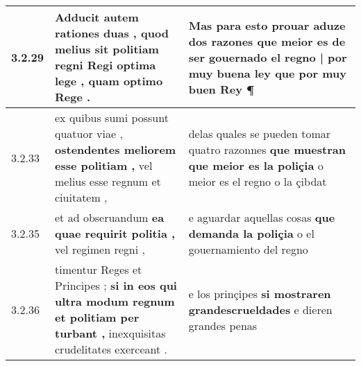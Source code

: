 \begin{tabular}{|p{1cm}|p{6.5cm}|p{6.5cm}|}
3.2.29 & Adducit autem rationes duas , \textbf{ quod melius sit politiam regni Regi optima lege , } quam optimo Rege . & Mas para esto prouar aduze dos razones \textbf{ que meior es de ser gouernado el regno | por muy buena ley } que por muy buen Rey ¶ \\\hline
3.2.33 & ex quibus sumi possunt quatuor viae , \textbf{ ostendentes meliorem esse politiam , } vel melius esse regnum et ciuitatem , & delas quales se pueden tomar quatro razonnes \textbf{ que muestran que meior es la poliçia } o meior es el regno o la çibdat \\\hline
3.2.35 & et ad obseruandum \textbf{ ea quae requirit politia , } vel regimen regni , & e aguardar aquellas cosas \textbf{ que demanda la poliçia } o el gouernamiento del regno \\\hline
3.2.36 & timentur Reges et Principes ; \textbf{ si in eos qui ultra modum regnum et politiam per turbant , } inexquisitas crudelitates exerceant . & e los prinçipes \textbf{ si mostraren grandescrueldades } e dieren grandes penas \\\hline

\end{tabular}
